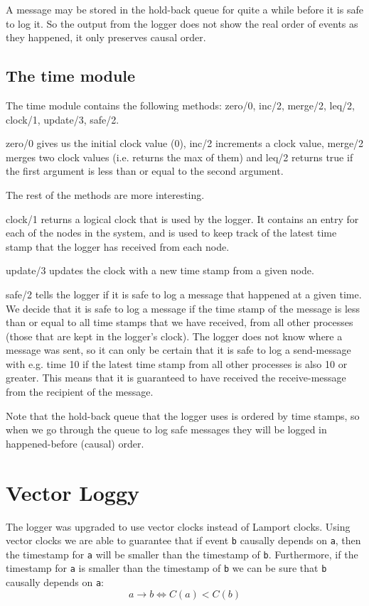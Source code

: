 \documentclass[a4paper, 11pt]{article}
\begin{document}
A message may be stored in the hold-back queue for quite a while before it is safe to log it. So the output from the logger does not show the real order of events as they happened, it only preserves causal order.

\subsection{The time module}

The time module contains the following methods: zero/0, inc/2, merge/2, leq/2, clock/1, update/3, safe/2.

zero/0 gives us the initial clock value (0), inc/2 increments a clock value, merge/2 merges two clock values (i.e. returns the max of them) and leq/2 returns true if the first argument is less than or equal to the second argument.

The rest of the methods are more interesting.

clock/1 returns a logical clock that is used by the logger. It contains an entry for each of the nodes in the system, and is used to keep track of the latest time stamp that the logger has received from each node. 

update/3 updates the clock with a new time stamp from a given node.

safe/2 tells the logger if it is safe to log a message that happened at a given time. We decide that it is safe to log a message if the time stamp of the message is less than or equal to all time stamps that we have received, from all other processes (those that are kept in the logger's clock). The logger does not know where a message was sent, so it can only be certain that it is safe to log a send-message with e.g. time 10 if the latest time stamp from all other processes is also 10 or greater. This means that it is guaranteed to have received the receive-message from the recipient of the message.

Note that the hold-back queue that the logger uses is ordered by time stamps, so when we go through the queue to log safe messages they will be logged in happened-before (causal) order.

\section{Vector Loggy}

The logger was upgraded to use vector clocks instead of Lamport clocks. Using vector clocks we are able to guarantee that if event \texttt{b} causally depends on \texttt{a}, then the timestamp for \texttt{a} will be smaller than the timestamp of \texttt{b}. Furthermore, if the timestamp for \texttt{a} is smaller than the timestamp of \texttt{b} we can be sure that \texttt{b} causally depends on \texttt{a}: 
\[ a \rightarrow b \Leftrightarrow C(a)<C(b) \]
\end{document}
